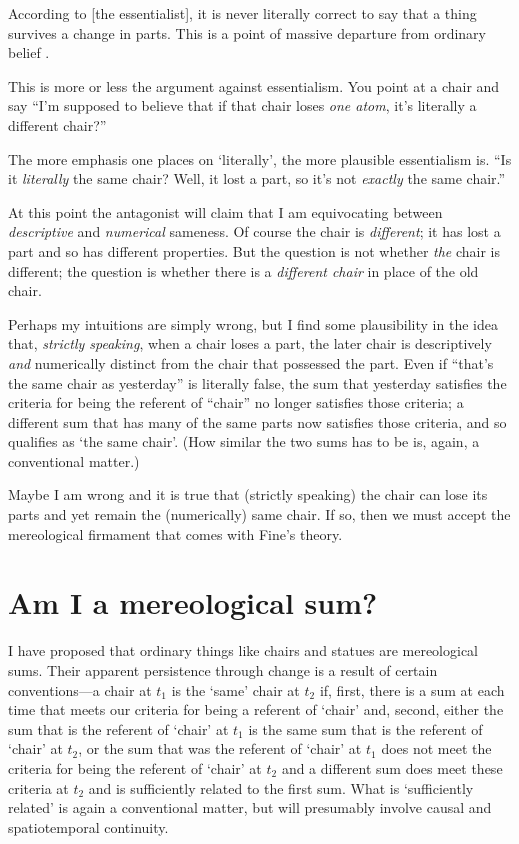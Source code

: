 \documentclass[11pt]{article}
\newenvironment{squote}{%
\begin{spacing}{1}
\begin{list}{}{%
\setlength{\labelwidth}{0pt}%
\rightmargin\leftmargin%
}
\item\relax
}{%
\end{list}%
\end{spacing}
}
\begin{document}
\begin{spacing}{1.5}
\begin{squote}
According to [the essentialist], it is never literally correct to say
that a thing survives a change in parts.  This is a point of massive
departure from ordinary belief \citep[184]{sider2001}.
\end{squote}

This is more or less the argument against essentialism.  You point at
a chair and say ``I'm supposed to believe that if that chair loses
{\em one atom}, it's literally a different chair?''

The more emphasis one places on `literally', the more plausible
essentialism is.  ``Is it {\em literally} the same chair?  Well, it
lost a part, so it's not {\em exactly} the same chair.''

At this point the antagonist will claim that I am equivocating between
{\em descriptive} and {\em numerical} sameness.  Of course the chair
is {\em different}; it has lost a part and so has different
properties.  But the question is not whether {\em the} chair is
different; the question is whether there is a {\em different chair} in
place of the old chair.

Perhaps my intuitions are simply wrong, but I find some plausibility
in the idea that, {\em strictly speaking}, when a chair loses a part,
the later chair is descriptively {\em and} numerically distinct from
the chair that possessed the part.  Even if ``that's the same chair as
yesterday'' is literally false, the sum that yesterday satisfies the
criteria for being the referent of ``chair'' no longer satisfies those
criteria; a different sum that has many of the same parts now
satisfies those criteria, and so qualifies as `the same chair'.  (How
similar the two sums has to be is, again, a conventional matter.)

Maybe I am wrong and it is true that (strictly speaking) the chair can
lose its parts and yet remain the (numerically) same chair.  If so,
then we must accept the mereological firmament that comes with Fine's
theory.

\section{Am I a mereological sum?}
\label{i-sum}
I have proposed that ordinary things like chairs and statues are
mereological sums.  Their apparent persistence through change is a
result of certain conventions---a chair at $t_1$ is the `same' chair
at $t_2$ if, first, there is a sum at each time that meets our
criteria for being a referent of `chair' and, second, either the sum
that is the referent of `chair' at $t_1$ is the same sum that is the
referent of `chair' at $t_2$, or the sum that was the referent of
`chair' at $t_1$ does not meet the criteria for being the referent
of `chair' at $t_2$ and a different sum does meet these criteria at
$t_2$ and is sufficiently related to the first sum.  What is
`sufficiently related' is again a conventional matter, but will
presumably involve causal and spatiotemporal continuity.


\end{spacing}
\end{document}
